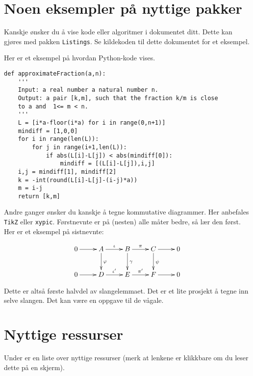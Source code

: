 \documentclass[a4paper, norsk]{article}  %
\begin{document}
\section{Noen eksempler på nyttige pakker}
\label{seksjonpakker}

Kanskje ønsker du å vise kode eller algoritmer i dokumentet ditt. Dette kan gjøres med pakken \texttt{Listings}. Se kildekoden til dette dokumentet for et eksempel. 

Her er et eksempel på hvordan Python-kode vises.

\begin{center}
\begin{lstlisting}
def approximateFraction(a,n):
	'''
	Input: a real number a natural number n.
	Output: a pair [k,m], such that the fraction k/m is close 
	to a and  1<= m < n.
	'''
	L = [i*a-floor(i*a) for i in range(0,n+1)]
	mindiff = [1,0,0]
	for i in range(len(L)):
		for j in range(i+1,len(L)):
			if abs(L[i]-L[j]) < abs(mindiff[0]):
				mindiff = [(L[i]-L[j]),i,j]
	i,j = mindiff[1], mindiff[2]
	k = -int(round(L[i]-L[j]-(i-j)*a))
	m = i-j
	return [k,m]
\end{lstlisting}
\end{center}

Andre ganger ønsker du kanskje å tegne kommutative diagrammer. Her anbefales \texttt{TikZ} eller \texttt{xypic}. Førstnevnte er på (nesten) alle måter bedre, så lær den først. Her er et eksempel på sistnevnte:

\begin{equation}
\begin{gathered}
\xymatrix{
0 \ar[r] & A \ar[r]^\iota \ar[d]^\varphi & B \ar[r]^\pi \ar[d]^\gamma & C \ar[r]\ar[d]^\psi & 0 \\ 
0 \ar[r] & D \ar[r]^{\iota'} & E \ar[r]^{\pi'} & F \ar[r] & 0
}
\end{gathered}
\end{equation}

Dette er altså første halvdel av slangelemmaet. Det er et lite prosjekt å tegne inn selve slangen. Det kan være en oppgave til de vågale.


\section{Nyttige ressurser}
\label{seksjon:ressurser} 

Under er en liste over nyttige ressurser (merk at lenkene er klikkbare om du leser dette på en skjerm). 
\end{document}
